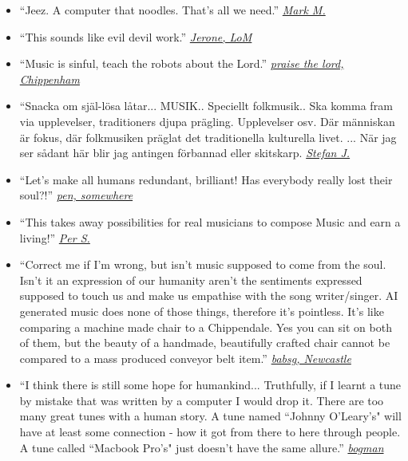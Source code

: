 \documentclass[a4paper,notitlepage,twoside]{book}
\begin{document}
\begin{itemize}
\item ``Jeez. A computer that noodles. That’s all we need.'' \href{https://thesession.org/discussions/37800}{{\em Mark M.}}
\item ``This sounds like evil devil work.'' \href{https://thesession.org/discussions/37800}{{\em Jerone, LoM}}
\item ``Music is sinful, teach the robots about the Lord.'' \href{https://www.dailymail.co.uk/sciencetech/article-4544400/Researchers-create-computer-writes-folk-music.html#comments}{{\em praise the lord, Chippenham}}
\item ``Snacka om själ-lösa låtar... MUSIK.. Speciellt folkmusik.. Ska komma fram via upplevelser, traditioners djupa prägling. Upplevelser osv. Där människan är fokus, där folkmusiken präglat det traditionella kulturella livet. ... När jag ser sådant här blir jag antingen förbannad eller skitskarp. \href{https://www.facebook.com/groups/svenskfolkmusik/permalink/10156536106241145/}{{\em Stefan J.}}
\item ``Let's make all humans redundant, brilliant! Has everybody really lost their soul?!'' \href{https://www.dailymail.co.uk/sciencetech/article-4544400/Researchers-create-computer-writes-folk-music.html#comments}{{\em pen, somewhere}}
\item ``This takes away possibilities for real musicians to compose Music and earn a living!'' \href{https://www.facebook.com/groups/svenskfolkmusik/permalink/10156536106241145/}{{\em Per S.}}
\item ``Correct me if I'm wrong, but isn't music supposed to come from the soul. Isn't it an expression of our humanity aren't the sentiments expressed supposed to touch us and make us empathise with the song writer/singer. AI generated music does none of those things, therefore it's pointless. It's like comparing a machine made chair to a Chippendale. Yes you can sit on both of them, but the beauty of a handmade, beautifully crafted chair cannot be compared to a mass produced conveyor belt item.'' \href{https://www.dailymail.co.uk/sciencetech/article-4544400/Researchers-create-computer-writes-folk-music.html#comments}{{\em babsg, Newcastle}}
\item ``I think there is still some hope for humankind... Truthfully, if I learnt a tune by mistake that was written by a computer I would drop it. There are too many great tunes with a human story. A tune named ``Johnny O’Leary’s" will have at least some connection - how it got from there to here through people. A tune called ``Macbook Pro’s" just doesn’t have the same allure.'' \href{https://thesession.org/discussions/42458}{{\em bogman}}

\end{itemize}
\end{document}
